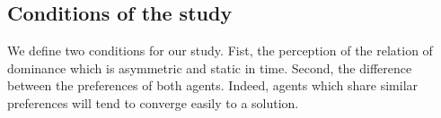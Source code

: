 \documentclass{llncs}
\begin{document}
\subsection{Conditions of the study}
We define two conditions for our study. Fist, the perception of the relation of dominance which is asymmetric and static in time. Second, the difference between the preferences of both agents. Indeed, agents which share similar preferences will tend to converge easily to a solution. 


\noindent 
\vskip 4pt


\end{document}

